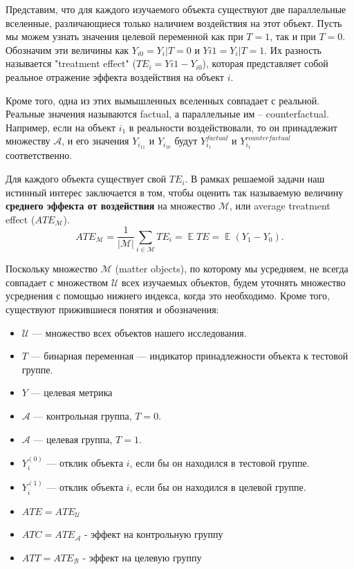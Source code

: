 \documentclass{article}
\DeclareMathOperator{\E}{\mathbb{E}}
\begin{document}
        Представим, что для каждого изучаемого объекта существуют две параллельные вселенные, различающиеся только наличием воздействия на этот объект. Пусть мы можем узнать значения целевой переменной как при $T=1$, так и при $T=0$. Обозначим эти величины как $Y_{i0} = Y_i|{T=0}$ и $Y{i1} = Y_i|{T=1}$. Их разность называется "treatment effect" ($TE_i = Y{i1} - Y_{i0}$), которая представляет собой реальное отражение эффекта воздействия на объект $i$.

        Кроме того, одна из этих вымышленных вселенных совпадает с реальной. Реальные значения называются factual, а параллельные им – counterfactual. Например, если на объект $i_1$ в реальности воздействовали, то он принадлежит множеству $\mathcal{A}$, и его значения $Y_{i_11}$ и $Y_{i_10}$ будут $Y_{i_1}^{factual}$ и $Y_{i_1}^{counterfactual}$ соответственно.

        Для каждого объекта существует свой $TE_i$. В рамках решаемой задачи наш истинный интерес заключается в том, чтобы оценить так называемую величину \textbf{среднего эффекта от воздействия} на множество  $\mathcal{M}$, или average treatment effect ($ATE_\mathcal{M}$).
                $$
                    ATE_\mathcal{\mathcal{M}}=
                    \frac{1}{|\mathcal{M}|} \displaystyle\sum_{i\in\mathcal{M}}TE_i=
                    \E{}TE=
                    \E{}(Y_1-Y_0).
                $$

        Поскольку множество $\mathcal{M}$ (matter objects), по которому мы усредняем, не всегда совпадает с множеством $\mathcal{U}$ всех изучаемых объектов, будем уточнять множество усреднения с помощью нижнего индекса, когда это необходимо. Кроме того, существуют прижившиеся понятия и обозначения:

        \begin{itemize}
            \item \( \mathcal{U} \) — множество всех объектов нашего исследования.
            \item \( T \) — бинарная переменная — индикатор принадлежности объекта к тестовой группе.

            \item \( Y \) — целевая метрика

            \item $\mathcal{A}$ — контрольная группа, $T = 0$.
            \item $\mathcal{A}$ — целевая группа, $T = 1$.

            \item \( Y_i^{(0)} \) — отклик объекта \( i \), если бы он находился в тестовой группе.
            \item \( Y_i^{(1)} \) — отклик объекта \( i \), если бы он находился в целевой группе.

            \item $ATE = ATE_\mathcal{U}$
            \item $ATC = ATE_\mathcal{A}$ - эффект на контрольную группу
            \item $ATT = ATE_\mathcal{B}$ - эффект на целевую группу
        \end{itemize}
\end{document}
